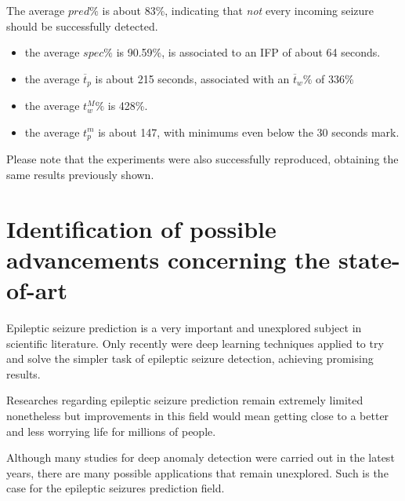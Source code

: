 The average $pred\%$ is about 83\%, indicating that \textit{not} every incoming seizure should be successfully detected.
\begin{itemize}
    \item the average $spec\%$ is 90.59\%, is associated to an \gls{IFP} of about 64 seconds.
    \item the average $\overline{t}_p$ is about 215 seconds, associated with an $\overline{t}_w\%$ of 336\%
    \item the average $t_w^M\%$ is 428\%.
    \item the average $t_p^m$ is about 147, with minimums even below the 30 seconds mark.
\end{itemize}

Please note that the experiments were also successfully reproduced, obtaining the same results previously shown.


\section{Identification of possible advancements concerning the state-of-art}
Epileptic seizure prediction is a very important and unexplored subject in scientific literature. Only recently were deep learning techniques applied to try and solve the simpler task of epileptic seizure detection, achieving promising results.

Researches regarding epileptic seizure prediction remain extremely limited nonetheless but improvements in this field would mean getting close to a better and less worrying life for millions of people.

Although many studies for deep anomaly detection were carried out in the latest years, there are many possible applications that remain unexplored. Such is the case for the epileptic seizures prediction field.